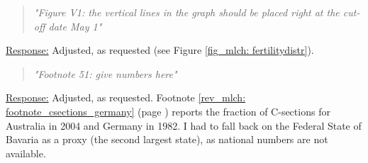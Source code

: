% 
\begin{quote}
	\textit{"Figure V1: the vertical lines in the graph should be placed right at the cut-off date May 1"}
\end{quote}
\underline{Response:} Adjusted, as requested (see Figure \ref{fig_mlch: fertilitydistr}).

% 
\begin{quote}
	\textit{"Footnote 51: give numbers here"}
\end{quote}
\underline{Response:} Adjusted, as requested. Footnote \ref{rev_mlch: footnote_csections_germany} (page \pageref{rev_mlch: footnote_csections_germany}) reports the fraction of C-sections for Australia in 2004 and Germany in 1982. I had to fall back on the Federal State of Bavaria as a proxy (the second largest state), as national numbers are not available.

